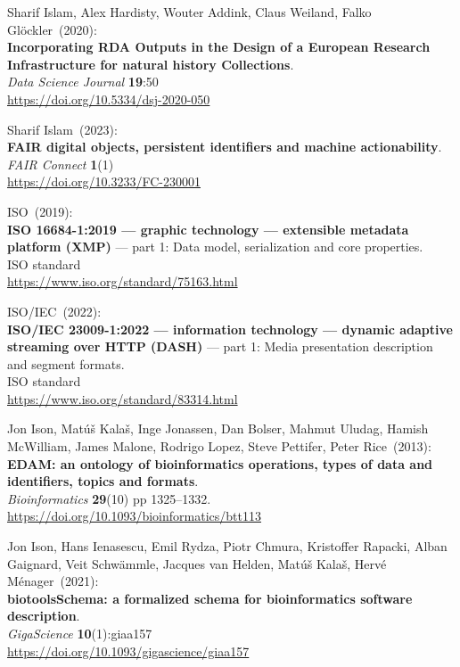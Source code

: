 \begin{thebibliography}{9}
Sharif Islam, Alex Hardisty, Wouter Addink, Claus Weiland, Falko Glöckler~(2020): \\
\textbf{Incorporating RDA Outputs in the Design of a European Research Infrastructure for natural history Collections}.\\
\emph{Data Science Journal} \textbf{19}:50\\
\url{https://doi.org/10.5334/dsj-2020-050}

Sharif Islam~(2023): \\
\textbf{FAIR digital objects, persistent identifiers and machine actionability}. \\
\emph{FAIR Connect} \textbf{1}(1) \\
\url{https://doi.org/10.3233/FC-230001}

ISO~(2019): \\
\textbf{{ISO} 16684-1:2019 --- graphic technology --- extensible metadata platform (XMP)} --- part 1: Data model, serialization and core properties.\\
ISO standard\\
\url{https://www.iso.org/standard/75163.html}

ISO/IEC~(2022): \\
\textbf{{ISO}/{IEC} 23009-1:2022 --- information technology --- dynamic adaptive streaming over HTTP (DASH)} --- part 1: Media
presentation description and segment formats.\\
ISO standard\\
\url{https://www.iso.org/standard/83314.html}

Jon Ison, Matúš Kalaš, Inge Jonassen, Dan Bolser, Mahmut Uludag, Hamish McWilliam, James Malone, Rodrigo Lopez, Steve Pettifer, Peter Rice~(2013): \\
\textbf{EDAM: an ontology of bioinformatics operations, types of data and identifiers, topics and formats}.\\
\emph{Bioinformatics} \textbf{29}(10) pp 1325--1332.\\
\url{https://doi.org/10.1093/bioinformatics/btt113}

Jon Ison, Hans Ienasescu, Emil Rydza, Piotr Chmura, Kristoffer Rapacki, Alban Gaignard, Veit Schwämmle, Jacques van Helden, Matúš Kalaš, Hervé Ménager~(2021): \\
\textbf{biotoolsSchema: a formalized schema for bioinformatics software description}.\\
\emph{GigaScience} \textbf{10}(1):giaa157\\
\url{https://doi.org/10.1093/gigascience/giaa157}


\end{thebibliography}
